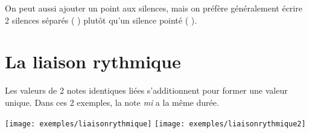 On peut aussi ajouter un point aux silences, mais on préfère généralement écrire 2 silences séparés ( \crotchetRest{} \quaverRest{} ) plutôt qu'un silence pointé ( \crotchetRestDotted{} ).

\section{La liaison rythmique}
Les valeurs de 2 notes identiques liées s'additionnent pour former une valeur unique. Dans ces 2 exemples, la note \emph{mi} a la même durée.
\begin{flushleft}
\texttt{[image: exemples/liaisonrythmique]}  \hspace{2 cm}\texttt{[image: exemples/liaisonrythmique2]} 
\end{flushleft}
